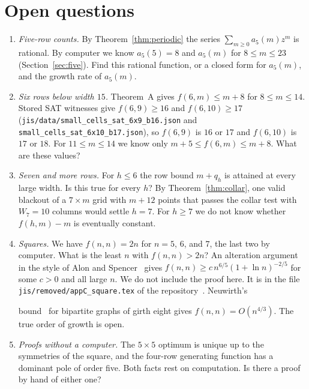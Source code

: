 \section{Open questions}\label{sec:open}

\begin{enumerate}[(1),leftmargin=*]
\item \emph{Five-row counts.} By Theorem~\ref{thm:periodic} the series
$\sum_{m\ge0}a_5(m)z^m$ is rational. By computer we know $a_5(5)=8$ and $a_5(m)$ for
$8\le m\le23$ (Section~\ref{sec:five}). Find this rational function, or a closed form for $a_5(m)$, and
the growth rate of $a_5(m)$.
\item \emph{Six rows below width $15$.} Theorem~A gives $f(6,m)\le m+8$ for
$8\le m\le14$. Stored SAT witnesses give $f(6,9)\ge16$ and $f(6,10)\ge17$
(\nolinkurl{jis/data/small_cells_sat_6x9_b16.json} and \nolinkurl{small_cells_sat_6x10_b17.json}),
so $f(6,9)$ is $16$ or $17$ and $f(6,10)$ is $17$ or $18$. For $11\le m\le14$ we know only
$m+5\le f(6,m)\le m+8$. What are these values?
\item \emph{Seven and more rows.} For $h\le6$ the row bound $m+q_h$ is attained at every
large width. Is this true for every $h$? By Theorem~\ref{thm:collar}, one valid blackout
of a $7\times m$ grid with $m+12$ points that passes the collar test with $W_7=10$ columns
would settle $h=7$. For $h\ge7$ we do not know whether $f(h,m)-m$ is eventually constant.
\item \emph{Squares.} We have $f(n,n)=2n$ for $n=5$, $6$, and $7$, the last two by
computer. What is the least $n$ with $f(n,n)>2n$? An alteration argument in the style of Alon
and Spencer~\cite[Section~3.2]{alonspencer2016} gives $f(n,n)\ge c\,n^{6/5}(1+\ln n)^{-2/5}$
for some $c>0$ and all large $n$. We do not include the proof here. It is in the file
\nolinkurl{jis/removed/appC_square.tex} of the repository~\cite{repo}. Neuwirth's

bound~\cite[Corollary~16]{neuwirth2001} for bipartite graphs of girth eight gives
$f(n,n)=O(n^{4/3})$. The true order of growth is open.
\item \emph{Proofs without a computer.} The $5\times5$ optimum is unique up to the
symmetries of the square, and the four-row generating function has a dominant pole of
order five. Both facts rest on computation. Is there a proof by hand of either one?
\end{enumerate}
